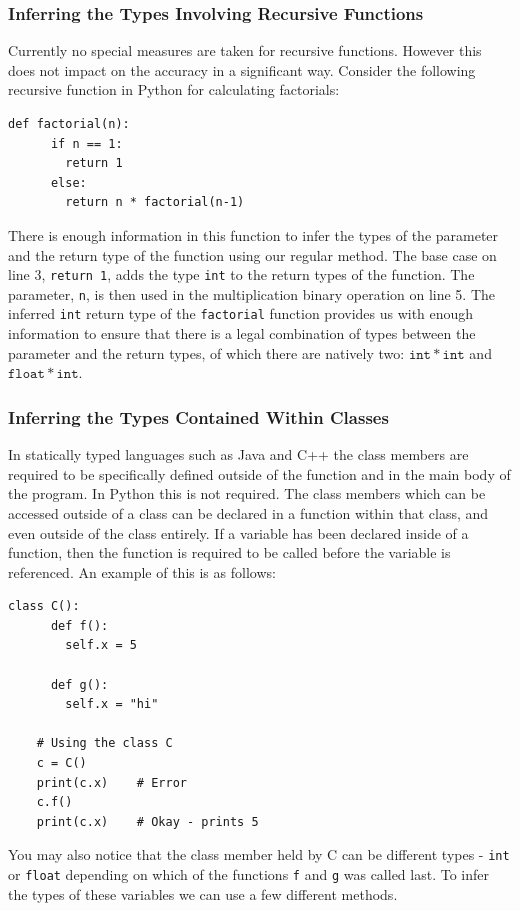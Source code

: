 \documentclass[12pt, titlepage]{article}
\begin{document}
\subsubsection{Inferring the Types Involving Recursive Functions}
Currently no special measures are taken for recursive functions. However this does not impact on the accuracy in a significant way. Consider the following recursive function in Python for calculating factorials:
\begin{lstlisting}[mathescape]
    def factorial(n):
      if n == 1:
        return 1
      else:
        return n * factorial(n-1)
\end{lstlisting}
There is enough information in this function to infer the types of the parameter and the return type of the function using our regular method. The base case on line 3, \texttt{return 1}, adds the type \texttt{int} to the return types of the function. The parameter, \texttt{n}, is then used in the multiplication binary operation on line 5. The inferred \texttt{int} return type of the \texttt{factorial} function provides us with enough information to ensure that there is a legal combination of types between the parameter and the return types, of which there are natively two: $\mathtt{int * int}$ and $\mathtt{float * int}$.


\subsubsection{Inferring the Types Contained Within Classes}
\label{chap:inferringClasses}
In statically typed languages such as Java and C++ the class members are required to be specifically defined outside of the function and in the main body of the program. In Python this is not required. The class members which can be accessed outside of a class can be declared in a function within that class, and even outside of the class entirely. If a variable has been declared inside of a function, then the function is required to be called before the variable is referenced. An example of this is as follows:
\begin{lstlisting}[mathescape]
    class C():
      def f():
        self.x = 5
		
      def g():
        self.x = "hi"
        
    # Using the class C
    c = C()
    print(c.x)    # Error
    c.f()
    print(c.x)    # Okay - prints 5
\end{lstlisting}
You may also notice that the class member held by C can be different types - \texttt{int} or \texttt{float} depending on which of the functions \texttt{f} and \texttt{g} was called last. To infer the types of these variables we can use a few different methods.
\end{document}
